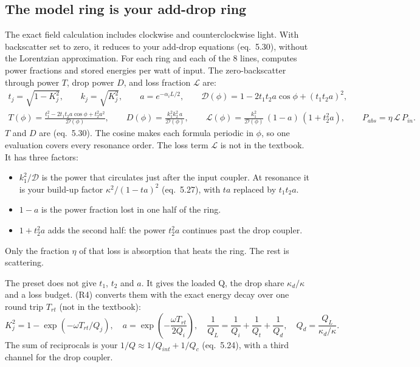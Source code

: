 \documentclass[11pt,letterpaper]{article}
\newcommand{\cd}[1]{\path{#1}}
\newcommand{\eq}[1]{(eq.~#1)}
\newcommand{\nib}{(not in the textbook)}
\begin{document}
\subsection{The model ring is your add-drop ring}\label{sec:ring}
The exact field calculation includes clockwise and counterclockwise light. With backscatter set to zero,
it reduces to your add-drop equations \eq{5.30}, without the Lorentzian approximation. For each ring and
each of the 8 lines, \cd{ring_rows_nb} computes power fractions and stored energies per watt of input.
The zero-backscatter through power $T$, drop power $D$, and loss fraction $\mathcal{L}$ are:
\begin{gather*}
t_j=\sqrt{1-K_j^2},\qquad k_j=\sqrt{K_j^2},\qquad a=e^{-\alpha_i L/2},\qquad
\mathcal{D}(\phi)=1-2t_1t_2a\cos\phi+(t_1t_2a)^2,\\
T(\phi)=\frac{t_1^2-2t_1t_2a\cos\phi+t_2^2a^2}{\mathcal{D}(\phi)},\qquad D(\phi)=\frac{k_1^2k_2^2\,a}{\mathcal{D}(\phi)},\qquad
\mathcal{L}(\phi)=\frac{k_1^2}{\mathcal{D}(\phi)}\,(1-a)\,(1+t_2^2a),\qquad P_{abs}=\eta\,\mathcal{L}\,P_{in}.
\end{gather*}
$T$ and $D$ are \eq{5.30}. The cosine makes each formula periodic in $\phi$, so one evaluation covers every
resonance order. The loss term $\mathcal{L}$ is not in the textbook. It has three factors:
\begin{itemize}
  \item $k_1^2/\mathcal{D}$ is the power that circulates just after the input coupler. At resonance it is your
  build-up factor $\kappa^2/(1-ta)^2$ \eq{5.27}, with $ta$ replaced by $t_1t_2a$.
  \item $1-a$ is the power fraction lost in one half of the ring.
  \item $1+t_2^2a$ adds the second half: the power $t_2^2a$ continues past the drop coupler.
\end{itemize}
Only the fraction $\eta$ of that loss is absorption that heats the ring. The rest is scattering.

The preset does not give $t_1$, $t_2$ and $a$. It gives the loaded Q, the drop share $\kappa_d/\kappa$ and a loss
budget. \cd{relations.py} (R4) converts them with the exact energy decay over one round trip $T_{rt}$
\nib:
\[
K_j^2=1-\exp(-\omega T_{rt}/Q_j),\quad a=\exp\!\left(-\frac{\omega T_{rt}}{2Q_i}\right),\quad
\frac1{Q_L}=\frac1{Q_i}+\frac1{Q_t}+\frac1{Q_d},\quad Q_d=\frac{Q_L}{\kappa_d/\kappa}.
\]
The sum of reciprocals is your $1/Q\approx1/Q_{int}+1/Q_c$ \eq{5.24}, with a third channel for the drop coupler.
\end{document}
